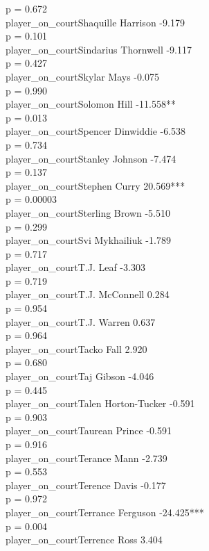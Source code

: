 \documentclass[
  landscape]{article}
\begin{document}
p = 0.672\\
player\_on\_courtShaquille Harrison -9.179\\
p = 0.101\\
player\_on\_courtSindarius Thornwell -9.117\\
p = 0.427\\
player\_on\_courtSkylar Mays -0.075\\
p = 0.990\\
player\_on\_courtSolomon Hill -11.558**\\
p = 0.013\\
player\_on\_courtSpencer Dinwiddie -6.538\\
p = 0.734\\
player\_on\_courtStanley Johnson -7.474\\
p = 0.137\\
player\_on\_courtStephen Curry 20.569***\\
p = 0.00003\\
player\_on\_courtSterling Brown -5.510\\
p = 0.299\\
player\_on\_courtSvi Mykhailiuk -1.789\\
p = 0.717\\
player\_on\_courtT.J. Leaf -3.303\\
p = 0.719\\
player\_on\_courtT.J. McConnell 0.284\\
p = 0.954\\
player\_on\_courtT.J. Warren 0.637\\
p = 0.964\\
player\_on\_courtTacko Fall 2.920\\
p = 0.680\\
player\_on\_courtTaj Gibson -4.046\\
p = 0.445\\
player\_on\_courtTalen Horton-Tucker -0.591\\
p = 0.903\\
player\_on\_courtTaurean Prince -0.591\\
p = 0.916\\
player\_on\_courtTerance Mann -2.739\\
p = 0.553\\
player\_on\_courtTerence Davis -0.177\\
p = 0.972\\
player\_on\_courtTerrance Ferguson -24.425***\\
p = 0.004\\
player\_on\_courtTerrence Ross 3.404\\
\end{document}
